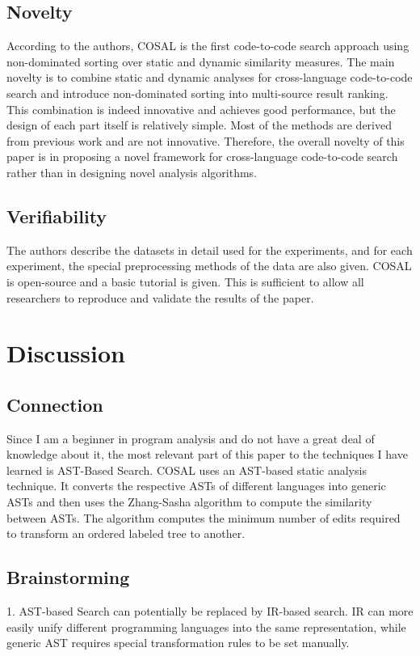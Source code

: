 \documentclass[conference]{IEEEtran}
\begin{document}
\subsection{Novelty}
According to the authors, COSAL is the first code-to-code search approach using non-dominated sorting over static and dynamic similarity measures. The main novelty is to combine static and dynamic analyses for cross-language code-to-code search and introduce non-dominated sorting into multi-source result ranking. This combination is indeed innovative and achieves good performance, but the design of each part itself is relatively simple. Most of the methods are derived from previous work and are not innovative. Therefore, the overall novelty of this paper is in proposing a novel framework for cross-language code-to-code search rather than in designing novel analysis algorithms.

\subsection{Verifiability}
The authors describe the datasets in detail used for the experiments, and for each experiment, the special preprocessing methods of the data are also given. COSAL is open-source and a basic tutorial is given. This is sufficient to allow all researchers to reproduce and validate the results of the paper.

\section{Discussion}
\subsection{Connection}
Since I am a beginner in program analysis and do not have a great deal of knowledge about it, the most relevant part of this paper to the techniques I have learned is AST-Based Search. COSAL uses an AST-based static analysis technique. It converts the respective ASTs of different languages into generic ASTs and then uses the Zhang-Sasha algorithm to compute the similarity between ASTs. The algorithm computes the minimum number of edits required to transform an ordered labeled tree to another.

\subsection{Brainstorming}
1. AST-based Search can potentially be replaced by IR-based search. IR can more easily unify different programming languages into the same representation, while generic AST requires special transformation rules to be set manually.
\end{document}
